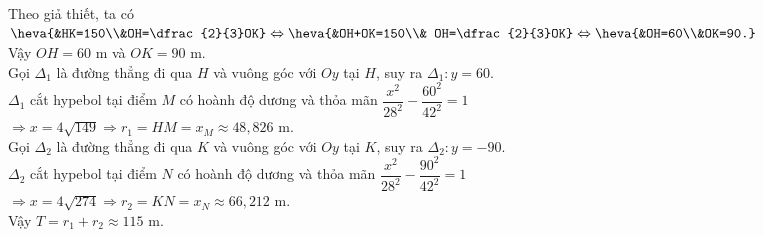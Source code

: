 \begin{bt}
{\begin{center}
\begin{tikzpicture}[scale=0.6, font=\footnotesize, line join=round, line cap=round, >=stealth]
			\end{tikzpicture}
		\end{center}
		Theo giả thiết, ta có $\heva{&HK=150\\&OH=\dfrac{2}{3}OK}\Leftrightarrow \heva{&OH+OK=150\\& OH=\dfrac{2}{3}OK}\Leftrightarrow \heva{&OH=60\\&OK=90.}$\\
		Vậy $OH=60$ m và $OK=90$ m.\\
		Gọi $\Delta_1$ là đường thẳng đi qua $H$ và vuông góc với $Oy$ tại $H$, suy ra $\Delta_1\colon y=60$.\\
		$\Delta_1$ cắt hypebol tại điểm $M$ có hoành độ dương và thỏa mãn $\dfrac{x^2}{28^2}-\dfrac{60^2}{42^2}=1$\\
		$\Rightarrow x=4\sqrt{149}\Rightarrow r_1=HM=x_M\approx 48{,}826$ m.\\
		Gọi $\Delta_2$ là đường thẳng đi qua $K$ và vuông góc với $Oy$ tại $K$, suy ra $\Delta_2\colon y=-90$.\\
		$\Delta_2$ cắt hypebol tại điểm $N$ có hoành độ dương và thỏa mãn $\dfrac{x^2}{28^2}-\dfrac{90^2}{42^2}=1$\\
		$\Rightarrow x=4\sqrt{274}\Rightarrow r_2=KN=x_N\approx 66{,}212$ m.\\
		Vậy $T=r_1+r_2\approx 115$	m.
	}
\end{bt}

